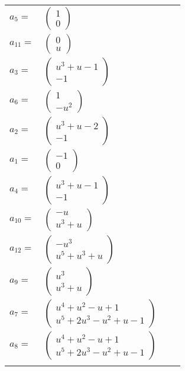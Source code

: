 \documentclass[1p]{elsarticle_modified}
\theoremstyle{definition}
\begin{document}
\begin{tabular}{m{7pt} m{180pt} m{7pt} m{180pt} }
\flushright $a_{5}=$&$\begin{pmatrix}1\\0\end{pmatrix}$ \\
\flushright $a_{11}=$&$\begin{pmatrix}0\\u\end{pmatrix}$ \\
\flushright $a_{3}=$&$\begin{pmatrix}u^3+u-1\\-1\end{pmatrix}$ \\
\flushright $a_{6}=$&$\begin{pmatrix}1\\- u^2\end{pmatrix}$ \\
\flushright $a_{2}=$&$\begin{pmatrix}u^3+u-2\\-1\end{pmatrix}$ \\
\flushright $a_{1}=$&$\begin{pmatrix}-1\\0\end{pmatrix}$ \\
\flushright $a_{4}=$&$\begin{pmatrix}u^3+u-1\\-1\end{pmatrix}$ \\
\flushright $a_{10}=$&$\begin{pmatrix}- u\\u^3+u\end{pmatrix}$ \\
\flushright $a_{12}=$&$\begin{pmatrix}- u^3\\u^5+u^3+u\end{pmatrix}$ \\
\flushright $a_{9}=$&$\begin{pmatrix}u^3\\u^3+u\end{pmatrix}$ \\
\flushright $a_{7}=$&$\begin{pmatrix}u^4+u^2- u+1\\u^5+2 u^3- u^2+u-1\end{pmatrix}$ \\
\flushright $a_{8}=$&$\begin{pmatrix}u^4+u^2- u+1\\u^5+2 u^3- u^2+u-1\end{pmatrix}$\\&\end{tabular}
\end{document}
